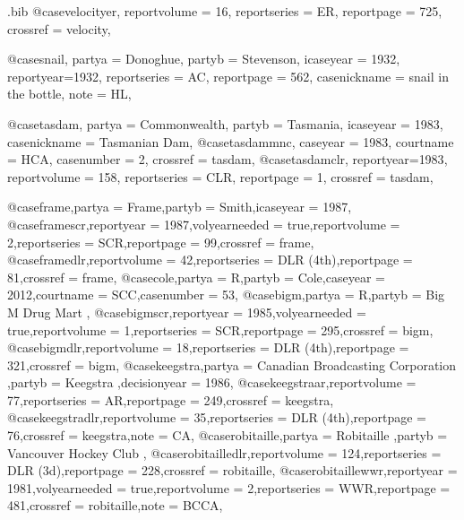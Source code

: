 \begin{filecontents*}{\jobname.bib}
@case{velocityer,
  reportvolume = {16},
  reportseries = {ER},
  reportpage = {725},
  crossref = {velocity},
}





@case{snail,
  partya = {Donoghue}, 
  partyb = {Stevenson},
  icaseyear = {1932},
  reportyear={1932},
  reportseries = {AC},
  reportpage = {562},
  casenickname = {snail in the bottle},
  note = {HL},
	}


@case{tasdam,
  partya = {Commonwealth}, 
  partyb = {Tasmania},
  icaseyear = {1983},
  casenickname = {Tasmanian Dam},
  }
@case{tasdammnc,
  caseyear = {1983},
  courtname = {HCA},
  casenumber = {2},
  crossref = {tasdam},
  }
@case{tasdamclr,
  reportyear={1983},
  reportvolume = {158},
  reportseries = {CLR},
  reportpage = {1},
  crossref = {tasdam},
  	}

@case{frame,partya = {Frame},partyb = {Smith},icaseyear = {1987},}
@case{framescr,reportyear = {1987},volyearneeded = {true},reportvolume = {2},reportseries = {SCR},reportpage = {99},crossref = {frame},}
@case{framedlr,reportvolume = {42},reportseries = {DLR (4th)},reportpage = {81},crossref = {frame},}
@case{cole,partya = {R},partyb = {Cole},caseyear = {2012},courtname = {SCC},casenumber = {53},}
@case{bigm,partya = {R},partyb = {Big M Drug Mart },}
@case{bigmscr,reportyear = {1985},volyearneeded = {true},reportvolume = {1},reportseries = {SCR},reportpage = {295},crossref = {bigm},}
@case{bigmdlr,reportvolume = {18},reportseries = {DLR (4th)},reportpage = {321},crossref = {bigm},}
@case{keegstra,partya = {Canadian Broadcasting Corporation },partyb = {Keegstra },decisionyear = {1986},}
@case{keegstraar,reportvolume = {77},reportseries = {AR},reportpage = {249},crossref = {keegstra},}
@case{keegstradlr,reportvolume = {35},reportseries = {DLR (4th)},reportpage = {76},crossref = {keegstra},note = {CA},}
@case{robitaille,partya = {Robitaille },partyb = {Vancouver Hockey Club },}
@case{robitailledlr,reportvolume = {124},reportseries = {DLR (3d)},reportpage = {228},crossref = {robitaille},}
@case{robitaillewwr,reportyear = {1981},volyearneeded = {true},reportvolume = {2},reportseries = {WWR},reportpage = {481},crossref = {robitaille},note = {BCCA},}








\end{filecontents*}
